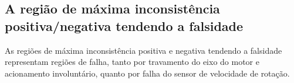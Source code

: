 \subsection{A região de máxima inconsistência positiva/negativa tendendo a falsidade}

As regiões de máxima inconsistência positiva e negativa tendendo a falsidade
representam regiões de falha,
tanto por travamento do eixo do motor e acionamento involuntário,
quanto por falha do sensor de velocidade de rotação.






